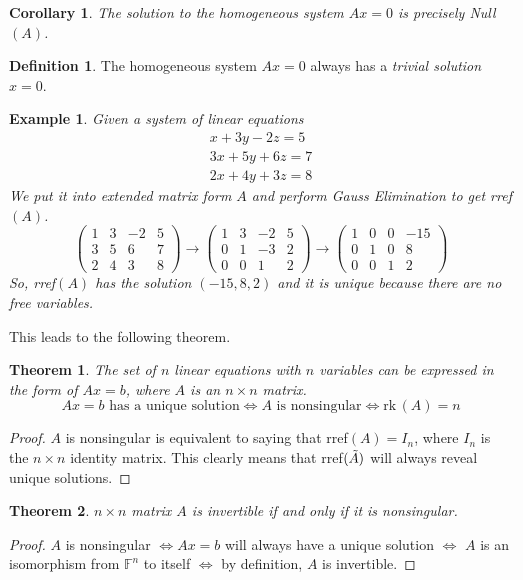 \documentclass{article}
\newtheorem{theorem}{Theorem}[section]
\newtheorem{example}{Example}[section]
\newtheorem{corollary}{Corollary}[theorem]
\theoremstyle{remark}
\theoremstyle{definition}
\newtheorem{definition}{Definition}[section]
\begin{document}
\begin{corollary}
The solution to the homogeneous system $A x = 0$ is precisely Null$(A)$. 
\end{corollary}

\begin{definition}
The homogeneous system $A x = 0$ always has a \textit{trivial solution} $x = 0$. 
\end{definition}

\begin{example}
Given a system of linear equations 
\begin{align*}
    x + 3 y - 2z = 5 \\
    3 x + 5 y + 6 z = 7 \\
    2 x + 4 y + 3 z = 8
\end{align*}
We put it into extended matrix form $A$ and perform Gauss Elimination to get rref$(A)$. 
\[\begin{pmatrix}
1 & 3&-2&5 \\ 3&5&6&7\\ 2&4&3&8
\end{pmatrix} \rightarrow \begin{pmatrix}
1&3&-2&5\\ 0&1&-3&2 \\ 0&0&1&2 \end{pmatrix} \rightarrow \begin{pmatrix}
1&0&0&-15 \\ 0&1&0&8 \\ 0&0&1&2
\end{pmatrix}\]
So, rref$(A)$ has the solution $(-15, 8, 2)$ and it is unique because there are no free variables. 
\end{example}

This leads to the following theorem. 

\begin{theorem}
The set of $n$ linear equations with $n$ variables can be expressed in the form of $A x = b$, where $A$ is an $n \times n$ matrix. 
\[ A x = b \text{ has a unique solution} \iff A \text{ is nonsingular} \iff \text{rk}\,(A) = n\]
\end{theorem}
\begin{proof}
$A$ is nonsingular is equivalent to saying that rref$(A) = I_n$, where $I_n$ is the $n \times n$ identity matrix. This clearly means that rref$(\Tilde{A})$ will always reveal unique solutions. 
\end{proof}

\begin{theorem}
$n \times n$ matrix $A$ is invertible if and only if it is nonsingular. 
\end{theorem}
\begin{proof}
$A$ is nonsingular $\iff A x = b$ will always have a unique solution $\iff$ $A$ is an isomorphism from $\mathbb{F}^n$ to itself $\iff$ by definition, $A$ is invertible. 
\end{proof}
\end{document}
